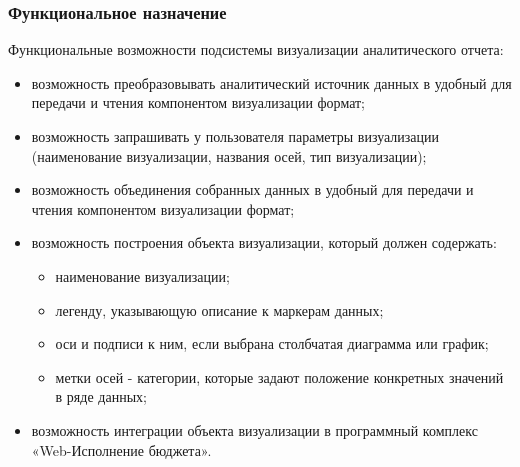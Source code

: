 \documentclass[a4paper]{extarticle}
\begin{document}
\subsubsection{Функциональное назначение}
Функциональные возможности подсистемы визуализации аналитического отчета:\par
\begin{itemize}
  \item возможность преобразовывать аналитический источник данных в удобный для передачи и чтения компонентом визуализации формат;
  \item возможность запрашивать у пользователя параметры визуализации (наименование визуализации, названия осей, тип визуализации);
  \item возможность объединения собранных данных в удобный для передачи и чтения компонентом визуализации формат;
  \item возможность построения объекта визуализации, который должен содержать:
    \begin{itemize}
    	\item наименование визуализации;
        \item легенду, указывающую описание к маркерам данных;
    	\item оси и подписи к ним, если выбрана столбчатая диаграмма или график;
        \item метки осей - категории, которые задают положение конкретных значений в ряде данных;
    \end{itemize}
  \item возможность интеграции объекта визуализации в программный комплекс «Web-Исполнение бюджета».
\end{itemize}\par
\end{document}
